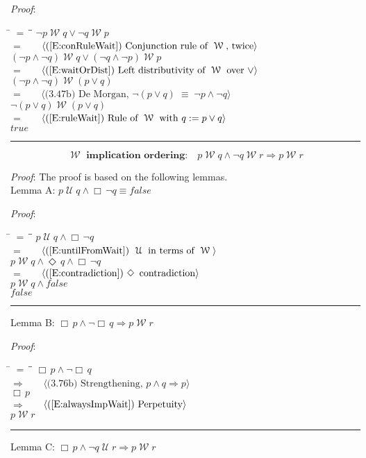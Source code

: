 \documentclass[12pt, fleqn, leqno]{article}
\newcommand{\lgap}{2pt}                             %
\newcommand{\llgap}{6pt}                            %
\newcommand{\mymathindent}{24pt}                    %
\newcommand{\equivs}{\ensuremath{\;\equiv\;}}       %
\newcommand{\impl}{\ensuremath{\Rightarrow}}        %
\newcommand{\Until}{\;\mathcal{U}\;}
\newcommand{\Wait}{\;\mathcal{W}\;}
\newcommand{\Event}{\Diamond\,}
\newcommand{\Always}{\Box\,}
\newcommand{\myqed}{\rule[-.23ex]{1.2ex}{2.0ex}}
\newcommand{\myqedtab}{\hspace{384pt}}              %
\newcommand{\Gll} {\langle}                         %
\newcommand{\Ggg} {\rangle}                         %
\newcommand{\Hint}[1]     {\ \ \ $\Gll              \mbox{#1} \Ggg$ }   %
\begin{document}
\emph{Proof}:
\begin{tabbing}
\hspace{\mymathindent} \= $= \;$ \= \myqedtab \= \kill
  \> \>   $\neg p \Wait q \lor \neg q \Wait p$\\[\lgap]
  \> $=$ \> \Hint{(\ref{E:conRuleWait}) Conjunction rule of $\Wait$, twice}\\[\lgap]
  \> \>   $(\neg p\land \neg q) \Wait q \lor (\neg q \land \neg p)\Wait p$\\[\lgap]
  \> $=$  \>  \Hint{(\ref{E:waitOrDist}) Left distributivity of $\Wait$ over $\lor$}\\[\lgap]
  \> \>   $(\neg p\land \neg q) \Wait (p\lor q)$\\[\lgap]
  \> $=$  \>  \Hint{(3.47b) De Morgan, $\neg(p\lor q)\equivs \neg p\land\neg q$}\\[\lgap]
  \> \>   $\neg (p\lor q)\Wait (p\lor q)$\\[\lgap]
  \> $=$  \>  \Hint{(\ref{E:ruleWait}) Rule of $\Wait$ with $q := p\lor q$}\\[\lgap]
  \> \>   $true$ \quad \myqed
\end{tabbing}
\begin{equation}\label{E:waitImplicationOrdering}
\textbf{$\Wait$ implication ordering:}\quad p \Wait q \land \neg q \Wait r \impl p \Wait r
\end{equation}

\emph{Proof}: The proof is based on the following lemmas.\\[\llgap]
Lemma A: $p \Until q \land \Always \neg q \equiv false$

\emph{Proof}:
\begin{tabbing}
\hspace{\mymathindent} \= $= \;$ \= \myqedtab \= \kill
  \> \>   $p \Until q \land \Always \neg q$\\[\lgap]
  \> $=$ \> \Hint{(\ref{E:untilFromWait}) $\Until$ in terms of $\Wait$} \\[\lgap]
  \> \>   $p \Wait q \land \Event q \land \Always \neg q$\\[\lgap]  
  \> $=$ \> \Hint{(\ref{E:contradiction}) $\Event$ contradiction} \\[\lgap]
  \> \>   $p \Wait q \land false$\\[\lgap]  
  \> \>   $ false$ \quad \myqed
\end{tabbing}
Lemma B: $\Always p \land \neg\Always q \impl p\Wait r$

\emph{Proof}:
\begin{tabbing}
\hspace{\mymathindent} \= $= \;$ \= \myqedtab \= \kill
  \> \>   $\Always p \land \neg\Always q$\\[\lgap]
  \> $\impl$  \>  \Hint{(3.76b) Strengthening, $p\land q \impl p$}\\[\lgap]
  \> \>   $\Always p$\\[\lgap]
  \> $\impl$ \> \Hint{(\ref{E:alwaysImpWait}) Perpetuity} \\[\lgap]
  \> \>   $p\Wait r$ \quad \myqed
\end{tabbing}
Lemma C: $\Always p \land \neg q\Until r \impl p \Wait r$
\end{document}
